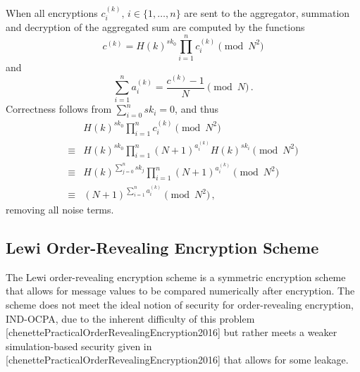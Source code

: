 When all encryptions $c^{(k)}_{i},\,i\in\{1,\dots,n\}$ are sent to the aggregator, summation and decryption of the aggregated sum are computed by the functions
\begin{equation}
    c^{(k)} = H(k)^{sk_0}\prod^{n}_{i=1}c^{(k)}_{i} \pmod{N^2} \label{eq:prelims:joye_libert_agg_sum}
\end{equation}
and
\begin{equation}
    \sum^{n}_{i=1}a^{(k)}_{i} = \frac{c^{(k)}-1}{N} \pmod{N}\,. \label{eq:prelims:joye_libert_agg_dec}
\end{equation}
Correctness follows from $\sum^{n}_{i=0}sk_i = 0$, and thus
\begin{equation*}
    \begin{split}
        &H(k)^{sk_0}\prod^{n}_{i=1}c^{(k)}_{i} \pmod{N^2} \\
        \equiv &H(k)^{sk_0}\prod^{n}_{i=1}(N+1)^{a^{(k)}_{i}} H(k)^{sk_i} \pmod{N^2} \\
        \equiv &H(k)^{\sum^n_{j=0}sk_j} \prod^{n}_{i=1}(N+1)^{a^{(k)}_{i}} \pmod{N^2} \\
        \equiv &(N+1)^{\sum^n_{i=1}a^{(k)}_{i}} \pmod{N^2}\,,
    \end{split}
\end{equation*}
removing all noise terms.

% 
% 

\subsection{Lewi Order-Revealing Encryption Scheme}\label{subsec:prelims:lewi_ore}
The Lewi order-revealing encryption scheme is a symmetric encryption scheme that allows for message values to be compared numerically after encryption. The scheme does not meet the ideal notion of security for order-revealing encryption, IND-OCPA, due to the inherent difficulty of this problem [chenettePracticalOrderRevealingEncryption2016] but rather meets a weaker simulation-based security given in [chenettePracticalOrderRevealingEncryption2016] that allows for some leakage.

